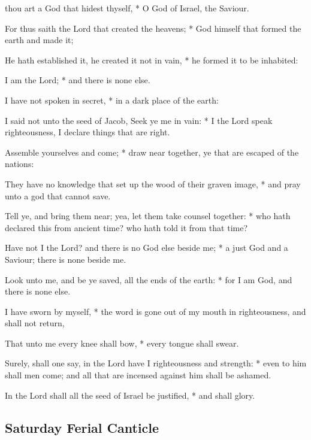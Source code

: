 \begin{multicols}{2}
 thou art a God that hidest thyself, * O God of Israel, the Saviour.\par
{}
For thus saith the Lord that created the heavens; * God himself that formed the earth and made it;\par
He hath established it, he created it not in vain, * he formed it to be inhabited:\par
I am the Lord; * and there is none else.\par
I have not spoken in secret, * in a dark place of the earth:\par
I said not unto the seed of Jacob, Seek ye me in vain: * I the Lord speak righteousness, I declare things that are right.\par
Assemble yourselves and come; * draw near together, ye that are escaped of the nations:\par
They have no knowledge that set up the wood of their graven image, * and pray unto a god that cannot save.\par
Tell ye, and bring them near; {\dag} yea, let them take counsel together: * who hath declared this from ancient time? who hath told it from that time?\par
Have not I the Lord? and there is no God else beside me; * a just God and a Saviour; there is none beside me.\par
Look unto me, and be ye saved, all the ends of the earth: * for I am God, and there is none else.\par
I have sworn by myself, * the word is gone out of my mouth in righteousness, and shall not return,\par
That unto me every knee shall bow, * every tongue shall swear.\par
Surely, shall one say, in the Lord have I righteousness and strength: * even to him shall men come; and all that are incensed against him shall be ashamed.\par
In the Lord shall all the seed of Israel be justified, * and shall glory.

\subsection{Saturday Ferial Canticle}


\end{multicols}
